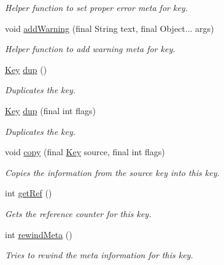 \begin{DoxyCompactItemize}
\begin{DoxyCompactList}\small\item\em Helper function to set proper error meta for key. \end{DoxyCompactList}\item 
void \hyperlink{classorg_1_1libelektra_1_1Key_a542a69d75c304dda3f78cb3b185022ee}{add\+Warning} (final String text, final Object... args)
\begin{DoxyCompactList}\small\item\em Helper function to add warning meta for key. \end{DoxyCompactList}\item 
\hyperlink{classorg_1_1libelektra_1_1Key}{Key} \hyperlink{classorg_1_1libelektra_1_1Key_a67a839951aa9bc48f8ffbb1ebcdfb819}{dup} ()
\begin{DoxyCompactList}\small\item\em Duplicates the key. \end{DoxyCompactList}\item 
\hyperlink{classorg_1_1libelektra_1_1Key}{Key} \hyperlink{classorg_1_1libelektra_1_1Key_a6243553376f0620cc76b03cc961a5dad}{dup} (final int flags)
\begin{DoxyCompactList}\small\item\em Duplicates the key. \end{DoxyCompactList}\item 
void \hyperlink{classorg_1_1libelektra_1_1Key_a20c230c5edb3f53fe3a7059268aee5ab}{copy} (final \hyperlink{classorg_1_1libelektra_1_1Key}{Key} source, final int flags)
\begin{DoxyCompactList}\small\item\em Copies the information from the source key into this key. \end{DoxyCompactList}\item 
int \hyperlink{classorg_1_1libelektra_1_1Key_a3672b9c763ac97d78317b3d54a370107}{get\+Ref} ()
\begin{DoxyCompactList}\small\item\em Gets the reference counter for this key. \end{DoxyCompactList}\item 
int \hyperlink{classorg_1_1libelektra_1_1Key_aea5c4a3a24237dca57e55beca85db0be}{rewind\+Meta} ()
\begin{DoxyCompactList}\small\item\em Tries to rewind the meta information for this key. \end{DoxyCompactList}\item 

\end{DoxyCompactItemize}
